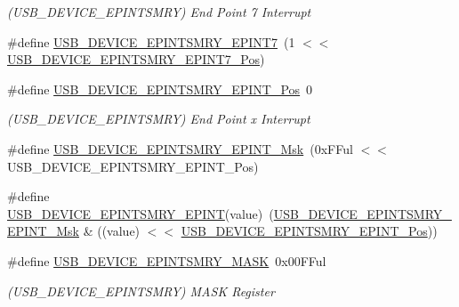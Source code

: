 \begin{DoxyCompactItemize}
\begin{DoxyCompactList}\small\item\em (U\+S\+B\+\_\+\+D\+E\+V\+I\+C\+E\+\_\+\+E\+P\+I\+N\+T\+S\+M\+RY) End Point 7 Interrupt \end{DoxyCompactList}\item 
\#define \mbox{\hyperlink{group___s_a_m_d21___u_s_b_ga3caa9dcc3265ab9c00ed91f1a62dd086}{U\+S\+B\+\_\+\+D\+E\+V\+I\+C\+E\+\_\+\+E\+P\+I\+N\+T\+S\+M\+R\+Y\+\_\+\+E\+P\+I\+N\+T7}}~(1 $<$$<$ \mbox{\hyperlink{group___s_a_m_d21___u_s_b_gab9f6a1a4a3a47a939dfcc0dcc90ef3af}{U\+S\+B\+\_\+\+D\+E\+V\+I\+C\+E\+\_\+\+E\+P\+I\+N\+T\+S\+M\+R\+Y\+\_\+\+E\+P\+I\+N\+T7\+\_\+\+Pos}})
\item 
\#define \mbox{\hyperlink{group___s_a_m_d21___u_s_b_ga6527db8bbe4ee6e8a5f375af2aa127e4}{U\+S\+B\+\_\+\+D\+E\+V\+I\+C\+E\+\_\+\+E\+P\+I\+N\+T\+S\+M\+R\+Y\+\_\+\+E\+P\+I\+N\+T\+\_\+\+Pos}}~0
\begin{DoxyCompactList}\small\item\em (U\+S\+B\+\_\+\+D\+E\+V\+I\+C\+E\+\_\+\+E\+P\+I\+N\+T\+S\+M\+RY) End Point x Interrupt \end{DoxyCompactList}\item 
\#define \mbox{\hyperlink{group___s_a_m_d21___u_s_b_ga289c32a39d1bc9cd57a7db52056614e4}{U\+S\+B\+\_\+\+D\+E\+V\+I\+C\+E\+\_\+\+E\+P\+I\+N\+T\+S\+M\+R\+Y\+\_\+\+E\+P\+I\+N\+T\+\_\+\+Msk}}~(0x\+F\+Ful $<$$<$ U\+S\+B\+\_\+\+D\+E\+V\+I\+C\+E\+\_\+\+E\+P\+I\+N\+T\+S\+M\+R\+Y\+\_\+\+E\+P\+I\+N\+T\+\_\+\+Pos)
\item 
\#define \mbox{\hyperlink{group___s_a_m_d21___u_s_b_ga324830608ce5508d668825cff77a7b80}{U\+S\+B\+\_\+\+D\+E\+V\+I\+C\+E\+\_\+\+E\+P\+I\+N\+T\+S\+M\+R\+Y\+\_\+\+E\+P\+I\+NT}}(value)~(\mbox{\hyperlink{group___s_a_m_d21___u_s_b_ga289c32a39d1bc9cd57a7db52056614e4}{U\+S\+B\+\_\+\+D\+E\+V\+I\+C\+E\+\_\+\+E\+P\+I\+N\+T\+S\+M\+R\+Y\+\_\+\+E\+P\+I\+N\+T\+\_\+\+Msk}} \& ((value) $<$$<$ \mbox{\hyperlink{group___s_a_m_d21___u_s_b_ga6527db8bbe4ee6e8a5f375af2aa127e4}{U\+S\+B\+\_\+\+D\+E\+V\+I\+C\+E\+\_\+\+E\+P\+I\+N\+T\+S\+M\+R\+Y\+\_\+\+E\+P\+I\+N\+T\+\_\+\+Pos}}))
\item 
\#define \mbox{\hyperlink{group___s_a_m_d21___u_s_b_ga653ef1be93b032a0f84e8c49b922889b}{U\+S\+B\+\_\+\+D\+E\+V\+I\+C\+E\+\_\+\+E\+P\+I\+N\+T\+S\+M\+R\+Y\+\_\+\+M\+A\+SK}}~0x00\+F\+Ful
\begin{DoxyCompactList}\small\item\em (U\+S\+B\+\_\+\+D\+E\+V\+I\+C\+E\+\_\+\+E\+P\+I\+N\+T\+S\+M\+RY) M\+A\+SK Register \end{DoxyCompactList}\item 
$$
\end{DoxyCompactItemize}
